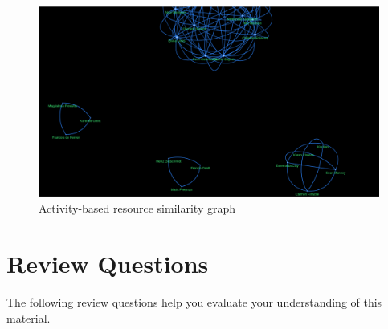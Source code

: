 \begin{figure}
\centering
\includegraphics[width=.66\textwidth]{screen3.png}
\caption{Activity-based resource similarity graph}
\label{fig:resource_similarity}
\end{figure}

\section{Review Questions}

The following review questions help you evaluate your understanding of this material.

